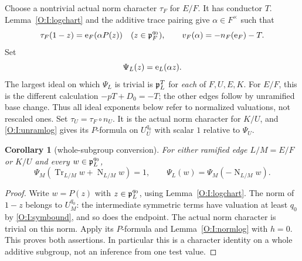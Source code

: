 \documentclass[11pt]{amsart}
\newtheorem{corollary}[theorem]{Corollary}
\theoremstyle{definition}
\theoremstyle{remark}
\newcommand{\Tr}{\operatorname{Tr}}
\newcommand{\Nm}{\operatorname{N}}
\begin{document}
Choose a nontrivial actual norm character $\tau_F$ for $E/F$. It has
conductor $T$. Lemma~\ref{O:I:logchart} and the additive trace pairing give
$\alpha\in F^\times$ such that
\begin{equation}\label{O:I:tauchart}
 \tau_F(1-z)=\mathrm e_F(\alpha P(z))\quad(z\in\mathfrak p_F^{q_0}),
 \qquad v_F(\alpha)=-n_F(\mathrm e_F)-T.
\end{equation}
Set
\[
 \Psi_L(z)=\mathrm e_L(\alpha z).
\]
The largest ideal on which $\Psi_L$ is trivial is $\mathfrak p_L^T$ for
\emph{each} of $F,U,E,K$. For $E/F$, this is the different calculation
$-pT+D_0=-T$; the other edges follow by unramified base change. Thus all
ideal exponents below refer to normalized valuations, not rescaled ones.
Set $\tau_U=\tau_F\circ n_U$. It is the actual norm character for $K/U$,
and \eqref{O:I:unramlog} gives its $P$-formula on $U_U^{q_0}$ with scalar $1$
relative to $\Psi_U$.

\begin{corollary}[whole-subgroup conversion]\label{O:I:conversion}
For either ramified edge $L/M=E/F$ or $K/U$ and every
$w\in\mathfrak p_L^{q_0}$,
\begin{equation}\label{O:I:conversioneq}
 \Psi_M(\Tr_{L/M}w+\Nm_{L/M}w)=1,
 \qquad
 \Psi_L(w)=\Psi_M(-\Nm_{L/M}w).
\end{equation}
\end{corollary}
\begin{proof}
Write $w=P(z)$ with $z\in\mathfrak p_L^{q_0}$, using Lemma~\ref{O:I:logchart}.
The norm of $1-z$ belongs to $U_M^{q_0}$: the intermediate symmetric
terms have valuation at least $q_0$ by \eqref{O:I:symbound}, and so does the
endpoint. The actual norm character is trivial on this norm.
Apply its $P$-formula and Lemma~\ref{O:I:normlog} with $h=0$.
This proves both assertions. In particular this is a character identity
on a whole additive subgroup, not an inference from one test value.
\end{proof}
\end{document}

